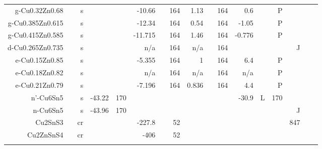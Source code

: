 \begin{table}[htbp]
\begin{adjustbox}{width=1\textwidth}
\begin{tabular}{rrrrrrrrrrrrrrrrr}
    g-Cu0.32Zn0.68 &       & s     &       &       & -10.66 &       & 164   & 1.13  &       & 164   & 0.6   &       & P     &       &       &  \\
    g-Cu0.385Zn0.615 &       & s     &       &       & -12.34 &       & 164   & 0.54  &       & 164   & -1.05 &       & P     &       &       &  \\
    g-Cu0.415Zn0.585 &       & s     &       &       & -11.715 &       & 164   & 1.46  &       & 164   & -0.776 &       & P     &       &       &  \\
    d-Cu0.265Zn0.735 &       & s     &       &       & n/a   &       & 164   & n/a   &       & 164   &       &       &       & J     &       &  \\
    e-Cu0.15Zn0.85 &       & s     &       &       & -5.355 &       & 164   & 1     &       & 164   & 6.4   &       & P     &       &       &  \\
    e-Cu0.18Zn0.82 &       & s     &       &       & n/a   &       & 164   & n/a   &       & 164   & n/a   &       & P     &       &       &  \\
    e-Cu0.21Zn0.79 &       & s     &       &       & -7.196 &       & 164   & 0.836 &       & 164   & 4.4   &       & P     &       &       &  \\
    n'-Cu6Sn5 &       & s     & -43.22 & 170   &       &       &       &       &       &       & -30.9 & L     & 170   &       &       &  \\
    n-Cu6Sn5 &       & s     & -43.96 & 170   &       &       &       &       &       &       &       &       &       & J     &       &  \\
    Cu2SnS3 &       & cr    &       &       & -227.8 &       & 52    &       &       &       &       &       &       & 847   &       &  \\
    Cu2ZnSnS4 &       & cr    &       &       & -406  &       & 52    &       &       &       &       &       &       &       &       &  \\
          &       &       &       &       &       &       &       &       &       &       &       &       &       &       &       &  \\
    \bottomrule
    \end{tabular}%
    \end{adjustbox}
  \label{tab:addlabel}%
\end{table}%
